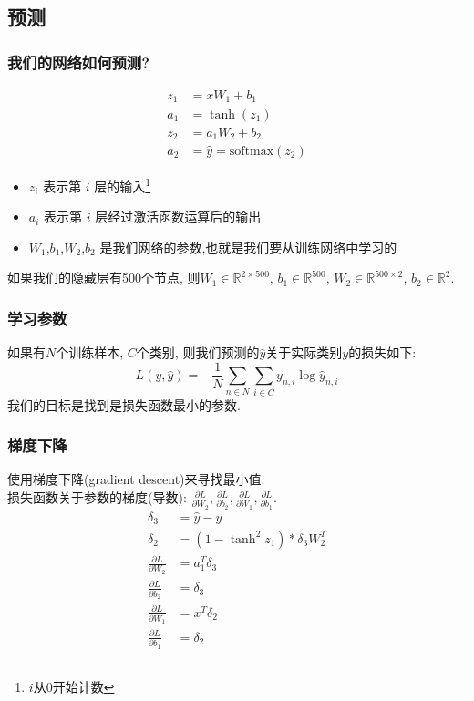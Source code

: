 \documentclass[table]{beamer}
\begin{document}
\subsection{预测}
\begin{frame}
	\frametitle{我们的网络如何预测?}
	\begin{equation}
		\begin{split}
			z_1 &= xW_1 + b_1\\
			a_1 &= \tanh(z_1)\\
			z_2 &= a_1W_2 + b_2\\
			a_2 &= \hat{y}=\mathrm{softmax}(z_2)
		\end{split}
	\end{equation}
	\begin{itemize}
		\item $z_i$ 表示第 $i$ 层的输入\footnote{$i$从0开始计数}
		\item $a_i$ 表示第 $i$ 层经过激活函数运算后的输出
		\item $W_1$,$b_1$,$W_2$,$b_2$ 是我们网络的参数,也就是我们要从训练网络中学习的
	\end{itemize}
	如果我们的隐藏层有500个节点, 则$W_1 \in \mathbb{R}^{2 \times 500}$, $b_1 \in \mathbb{R}^{500}$, $W_2 \in \mathbb{R}^{500 \times 2}$, $b_2 \in \mathbb{R}^2$.
\end{frame}
\begin{frame}
	\frametitle{学习参数}
	如果有$N$个训练样本, $C$个类别, 则我们预测的$\hat{y}$关于实际类别$y$的损失如下:
	\begin{equation}
		L(y,\hat{y})=-\frac{1}{N}\sum_{n \in N}\sum_{i \in C}{y_{n,i}\log{\hat{y}_{n,i}}}
	\end{equation}
	我们的目标是找到是损失函数最小的参数.
\end{frame}
\begin{frame}
	\frametitle{梯度下降}
	使用梯度下降(gradient descent)来寻找最小值.\\
	损失函数关于参数的梯度(导数): $\frac{\partial L}{\partial W_2}, \frac{\partial L}{\partial b_2}, \frac{\partial L}{\partial W_1}, \frac{\partial L}{\partial b_1}$.
	\begin{equation}
		\begin{split}
			\delta_3 &= \hat{y} - y\\
			\delta_2 &= (1-\tanh^2z_1)*\delta_3W^T_2\\
			\frac{\partial L}{\partial W_2} &= a^T_1\delta_3\\
			\frac{\partial L}{\partial b_2} &= \delta_3\\
			\frac{\partial L}{\partial W_1} &= x^T\delta_2\\
			\frac{\partial L}{\partial b_1} &= \delta_2
		\end{split}
	\end{equation}
\end{frame}
\end{document}
